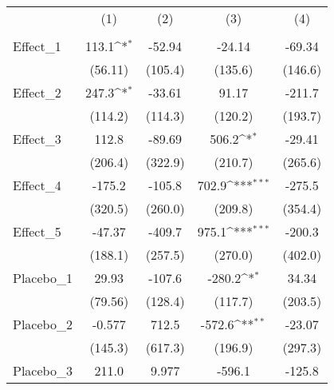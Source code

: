 {
\def\sym#1{\ifmmode^{#1}\else\(^{#1}\)\fi}
\begin{tabular}{l*{4}{c}}
\toprule
            &\multicolumn{1}{c}{(1)}&\multicolumn{1}{c}{(2)}&\multicolumn{1}{c}{(3)}&\multicolumn{1}{c}{(4)}\\
            &\multicolumn{1}{c}{} &\multicolumn{1}{c}{} &\multicolumn{1}{c}{} &\multicolumn{1}{c}{} \\
\midrule
Effect\_1    &       113.1\sym{*}  &      -52.94         &      -24.14         &      -69.34         \\
            &     (56.11)         &     (105.4)         &     (135.6)         &     (146.6)         \\
\addlinespace
Effect\_2    &       247.3\sym{*}  &      -33.61         &       91.17         &      -211.7         \\
            &     (114.2)         &     (114.3)         &     (120.2)         &     (193.7)         \\
\addlinespace
Effect\_3    &       112.8         &      -89.69         &       506.2\sym{*}  &      -29.41         \\
            &     (206.4)         &     (322.9)         &     (210.7)         &     (265.6)         \\
\addlinespace
Effect\_4    &      -175.2         &      -105.8         &       702.9\sym{***}&      -275.5         \\
            &     (320.5)         &     (260.0)         &     (209.8)         &     (354.4)         \\
\addlinespace
Effect\_5    &      -47.37         &      -409.7         &       975.1\sym{***}&      -200.3         \\
            &     (188.1)         &     (257.5)         &     (270.0)         &     (402.0)         \\
\addlinespace
Placebo\_1   &       29.93         &      -107.6         &      -280.2\sym{*}  &       34.34         \\
            &     (79.56)         &     (128.4)         &     (117.7)         &     (203.5)         \\
\addlinespace
Placebo\_2   &      -0.577         &       712.5         &      -572.6\sym{**} &      -23.07         \\
            &     (145.3)         &     (617.3)         &     (196.9)         &     (297.3)         \\
\addlinespace
Placebo\_3   &       211.0         &       9.977         &      -596.1         &      -125.8         \\

\end{tabular}}
